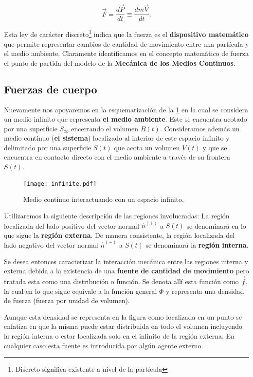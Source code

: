 \documentclass[../notas medios.tex]{subfiles}
\begin{document}
\begin{equation}
\vec F = \frac{{d\vec P}}{{dt}} \equiv \frac{{dm\vec V}}{{dt}}.
\label{morate}
\end{equation}

Esta ley de carácter discreto\footnote{Discreto significa existente a nivel de
la partícula} indica que la fuerza es el {\bf dispositivo matemático}  que
permite representar cambios de cantidad de movimiento entre una partícula y el
medio ambiente. Claramente identificamos en el concepto matemático de fuerza el
punto de partida del modelo de la {\bf Mecánica de los Medios Continuos}.

\subsection{Fuerzas de cuerpo}
Nuevamente nos apoyaremos en la esquematización de la \cref{infinite} en la cual
se considera un medio infinito que representa {\bf el medio ambiente}. Este se
encuentra acotado por una superficie ${S_\infty }$ encerrando el volumen $B(t)$.
Consideramos además un medio continuo ({\bf el sistema}) localizado al interior
de este espacio infinito y delimitado por una superficie $S(t)$ que acota un volumen $V(t)$
y que se encuentra en contacto directo con el medio ambiente a través de su frontera $S(t)$.


\begin{figure}[H]
\centering
	\texttt{[image: infinite.pdf]}
	\caption{Medio continuo interactuando con un espacio infinito.}
	\label{infinite}
\end{figure}

Utilizaremos la siguiente descripción de las regiones involucradas: La región
localizada del lado positivo del vector normal ${\hat n^{( + )}}$ a $S(t)$ se
denominará en lo que sigue la {\bf región externa}. De manera consistente, la
región localizada del lado negativo del vector normal ${\hat n^{( - )}}$ a
$S(t)$ se denominará la {\bf región interna}.

Se desea entonces caracterizar la interacción mecánica entre las regiones
interna y externa debida a la existencia de una {\bf fuente de cantidad de
movimiento} pero tratada esta como una distribución o función. Se denota allí
esta función como $\vec f$, la cual en lo que sigue equivale a la función
general $\Phi$ y representa una densidad de fuerza (fuerza por unidad de volumen).

Aunque esta densidad se representa en la figura como localizada en un punto se
enfatiza en que la misma puede estar distribuida en todo el volumen incluyendo
la región interna o estar localizada solo en el infinito de la región externa.
En cualquier caso esta fuente es introducida por algún agente externo.
\end{document}
